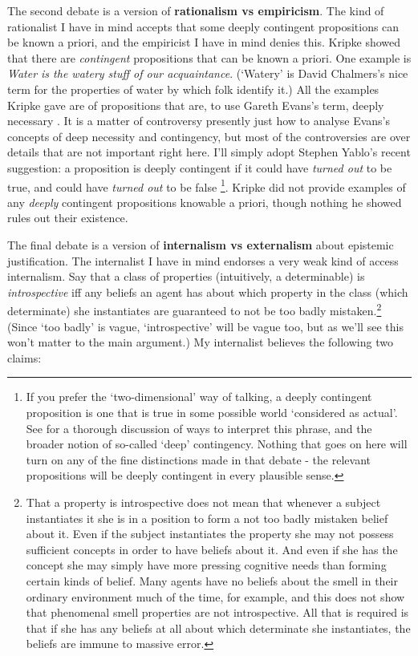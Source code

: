 The second debate is a version of \textbf{rationalism vs empiricism}. The kind of rationalist I have in mind accepts that some deeply contingent propositions can be known a priori, and the empiricist I have in mind denies this. Kripke showed that there are \textit{contingent} propositions that can be known a priori. One example is \textit{Water is the watery stuff of our acquaintance}. (`Watery' is David Chalmers's nice term for the properties of water by which folk identify it.) All the examples Kripke gave are of propositions that are, to use Gareth Evans's term, deeply necessary \citep{Evans1979}. It is a matter of controversy presently just how to analyse Evans's concepts of deep necessity and contingency, but most of the controversies are over details that are not important right here. I'll simply adopt Stephen Yablo's recent suggestion: a proposition is deeply contingent if it could have \textit{turned out} to be true, and could have \textit{turned out} to be false \citep{Yablo2002}\footnote{If you prefer the `two-dimensional' way of talking, a deeply contingent proposition is one that is true in some possible world `considered as actual'. See \citet{Chalmers2006} for a thorough discussion of ways to interpret this phrase, and the broader notion of so-called `deep' contingency. Nothing that goes on here will turn on any of the fine distinctions made in that debate - the relevant propositions will be deeply contingent in every plausible sense.}. Kripke did not provide examples of any \textit{deeply} contingent propositions knowable a priori, though nothing he showed rules out their existence.

The final debate is a version of \textbf{internalism vs externalism} about epistemic justification. The internalist I have in mind endorses a very weak kind of access internalism. Say that a class of properties (intuitively, a determinable) is \textit{introspective} iff any beliefs an agent has about which property in the class (which determinate) she instantiates are guaranteed to not be too badly mistaken.\footnote{That a property is introspective does not mean that whenever a subject instantiates it she is in a position to form a not too badly mistaken belief about it. Even if the subject instantiates the property she may not possess sufficient concepts in order to have beliefs about it. And even if she has the concept she may simply have more pressing cognitive needs than forming certain kinds of belief. Many agents have no beliefs about the smell in their ordinary environment much of the time, for example, and this does not show that phenomenal smell properties are not introspective. All that is required is that if she has any beliefs at all about which determinate she instantiates, the beliefs are immune to massive error.} (Since `too badly' is vague, `introspective' will be vague too, but as we'll see this won't matter to the main argument.) My internalist believes the following two claims:

